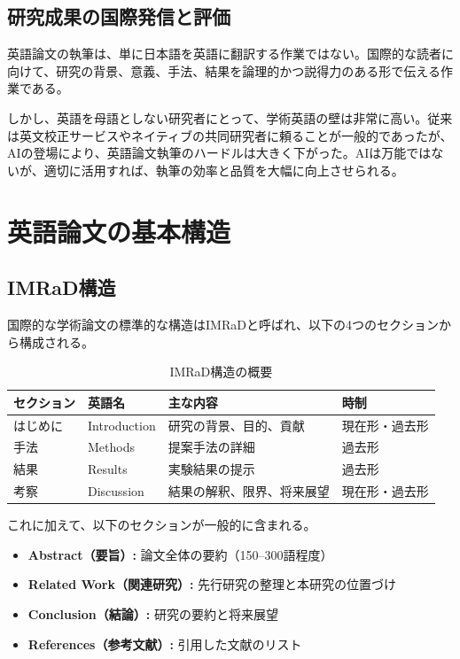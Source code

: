 \subsection{研究成果の国際発信と評価}

英語論文の執筆は、単に日本語を英語に翻訳する作業ではない。国際的な読者に向けて、研究の背景、意義、手法、結果を論理的かつ説得力のある形で伝える作業である。

しかし、英語を母語としない研究者にとって、学術英語の壁は非常に高い。従来は英文校正サービスやネイティブの共同研究者に頼ることが一般的であったが、AIの登場により、英語論文執筆のハードルは大きく下がった。AIは万能ではないが、適切に活用すれば、執筆の効率と品質を大幅に向上させられる。

\section{英語論文の基本構造}
\label{sec:4.2}

\subsection{IMRaD構造}

国際的な学術論文の標準的な構造はIMRaDと呼ばれ、以下の4つのセクションから構成される。

\begin{table}[htbp]
\centering
\caption{IMRaD構造の概要}
\label{tab:imrad}
\footnotesize
\begin{tabular}{llll}
\toprule
セクション & 英語名 & 主な内容 & 時制 \\
\midrule
はじめに & Introduction & 研究の背景、目的、貢献 & 現在形・過去形 \\
手法 & Methods & 提案手法の詳細 & 過去形 \\
結果 & Results & 実験結果の提示 & 過去形 \\
考察 & Discussion & 結果の解釈、限界、将来展望 & 現在形・過去形 \\
\bottomrule
\end{tabular}
\end{table}

これに加えて、以下のセクションが一般的に含まれる。

\begin{itemize}
\item \textbf{Abstract（要旨）:} 論文全体の要約（150--300語程度）
\item \textbf{Related Work（関連研究）:} 先行研究の整理と本研究の位置づけ
\item \textbf{Conclusion（結論）:} 研究の要約と将来展望
\item \textbf{References（参考文献）:} 引用した文献のリスト
\end{itemize}

